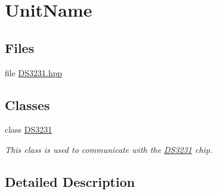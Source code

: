 \hypertarget{group___unit_name}{}\section{Unit\+Name}
\label{group___unit_name}
\subsection*{Files}
\begin{DoxyCompactItemize}
\item 
file \mbox{\hyperlink{_d_s3231_8hpp}{D\+S3231.\+hpp}}
\end{DoxyCompactItemize}
\subsection*{Classes}
\begin{DoxyCompactItemize}
\item 
class \mbox{\hyperlink{class_d_s3231}{D\+S3231}}
\begin{DoxyCompactList}\small\item\em This class is used to communicate with the \mbox{\hyperlink{class_d_s3231}{D\+S3231}} chip. \end{DoxyCompactList}\end{DoxyCompactItemize}


\subsection{Detailed Description}
